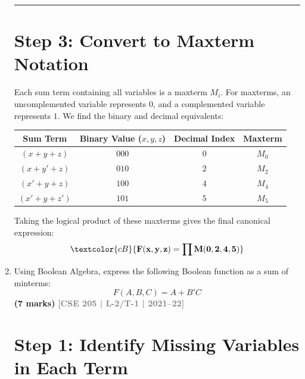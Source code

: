 \documentclass[12pt,a3paper]{article}
\newcommand{\yr}[1]{\hfill\textcolor{gray}{\small\textbf{[#1]}}}
\newcommand{\mk}[1]{\textcolor{orange!70!black}{\small\textbf{(#1 marks)}}}
\begin{document}
\begin{enumerate}
\begin{tcolorbox}[enhanced,breakable,ansbox,colback=cB!4,colframe=cB,boxrule=0.8pt,arc=5pt,title={\textbf{Answer}},fonttitle=\bfseries\color{white},colbacktitle=cB]
\vspace{0.2cm}
\hrule
\vspace{0.4cm}

\section*{Step 3: Convert to Maxterm Notation}

Each sum term containing all variables is a maxterm $M_i$. For maxterms, an uncomplemented variable represents $0$, and a complemented variable represents $1$. We find the binary and decimal equivalents:

\begin{center}
\renewcommand{\arraystretch}{1.3}
\begin{tabular}{c c c c}
    \toprule
    \textbf{Sum Term} & \textbf{Binary Value ($x, y, z$)} & \textbf{Decimal Index} & \textbf{Maxterm} \\
    \midrule
    $(x + y + z)$   & $000$ & $0$ & $M_0$ \\
    $(x + y' + z)$  & $010$ & $2$ & $M_2$ \\
    $(x' + y + z)$  & $100$ & $4$ & $M_4$ \\
    $(x' + y + z')$ & $101$ & $5$ & $M_5$ \\
    \bottomrule
\end{tabular}
\end{center}

Taking the logical product of these maxterms gives the final canonical expression:
\begin{equation}
    \textcolor{cB}{\mathbf{F(x, y, z) = \prod M(0, 2, 4, 5)}}
\end{equation}

\end{tcolorbox}

\item Using Boolean Algebra, express the following Boolean function as a sum of minterms:
\[ F(A,B,C) = A + B'C \]
\mk{7} \yr{CSE 205 | L-2/T-1 | 2021--22}

\begin{tcolorbox}[enhanced,breakable,ansbox,colback=cB!4,colframe=cB,boxrule=0.8pt,arc=5pt,title={\textbf{Answer}},fonttitle=\bfseries\color{white},colbacktitle=cB]

\section*{Step 1: Identify Missing Variables in Each Term}


\end{tcolorbox}
\end{enumerate}
\end{document}
